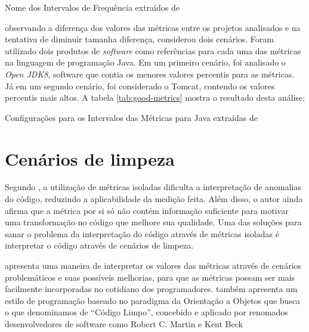 \begin{table}[!ht]
	\begin{center}
	
	\caption{Nome dos Intervalos de Frequência extraídos de }
	\label{tab:nomes}
	\end{center}
	\end{table}
	\FloatBarrier
	
 observando a diferença dos valores das métricas entre os projetos analisados e na tentativa de diminuir tamanha diferença, considerou dois cenários. Foram utilizado dois produtos de \textit{software} como referências para cada uma das
métricas na linguagem de programação Java. Em um primeiro cenário, foi analisado o \textit{Open JDK8}, software que contia os menores valores percentis para as métricas. Já em um segundo cenário, foi considerado o Tomcat, contendo os valores percentis mais altos. A tabela \ref{tab:good-metrics} mostra o resultado desta análise:

\begin{table}[!ht]
	\begin{center}
		
	\caption{Configurações para os Intervalos das Métricas para Java extraídas de }
	\label{tab:good-metrics}
	\end{center}
	\end{table}
	\FloatBarrier
   


\section{Cenários de limpeza} 

Segundo , a utilização de métricas isoladas dificulta a interpretação de anomalias do código, reduzindo a aplicabilidade da medição feita. Além disso, o autor ainda afirma que a métrica por si só não contém informação suficiente para motivar uma transformação no código que melhore sua qualidade. Uma das soluções para sanar o problema da interpretação do código através de métricas isoladas é  interpretar o código através de cenários de limpeza.

 apresenta uma maneira de interpretar os valores das métricas através de cenários problemáticos e suas possíveis melhorias, para que as métricas possam ser mais facilmente incorporadas no cotidiano dos programadores.  também apresenta um estilo de programação baseado no paradigma da Orientação a Objetos que busca o que denominamos de “Código Limpo”, concebido e aplicado por renomados desenvolvedores de software como Robert C. Martin \cite{Martin2008} e Kent Beck \cite{Beck2007}	
	
